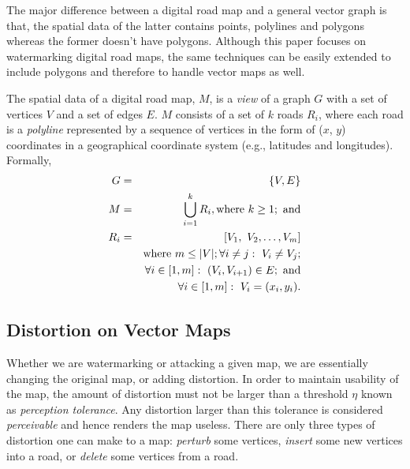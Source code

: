 The major difference between a digital road map and a general vector graph is that,
the spatial data of the latter contains points, polylines and polygons whereas 
the former doesn't have polygons.
Although this paper focuses on watermarking digital road maps, 
the same techniques can be easily extended to include polygons 
and therefore to handle vector maps as well. 

The spatial data of a digital road map, $M$, is a {\em view} of a graph $G$
with a set of vertices $V$ and a set of edges $E$.
$M$ consists of a set of $k$ roads $R_i$, where each road 
is a {\em polyline} represented by a sequence of vertices in 
the form of ($x$, $y$) coordinates in a geographical coordinate system 
(e.g., latitudes and longitudes). Formally,  
\begin{eqnarray*} \label{map}
G &=& \left\{V,E\right\}\\
M &=& \bigcup _{i=1}^{k}{ {R}_{i} }, {\rm where}~ k \ge 1;~ \rm{and}  \\ 
{R}_{i} &=& [ V_1,~ V_2, \ldots, V_m ]\\
&& {\rm where}~ m \le |V|; \forall i \neq j:~ V_i \neq V_j; \\ 
&& \forall i \in [1, m]:~ (V_i, V_{i+1})\in E;~  \rm{and} \\ 
&& \forall i \in [1, m]:~ V_i = (x_i, y_i).
\end{eqnarray*}



\subsection{Distortion on Vector Maps}


Whether we are watermarking or attacking a given map, we are essentially
changing the original map, or adding distortion. 
In order to maintain usability of the map, the amount of distortion
must not be larger than a threshold $\eta$ known as {\em perception tolerance}.
Any distortion larger than this tolerance is considered {\em perceivable} 
and hence renders the map useless.  
There are only three types of distortion one can make to a map: 
{\em perturb} some vertices, {\em insert} some new vertices into a road, or
{\em delete} some vertices from a road. 

